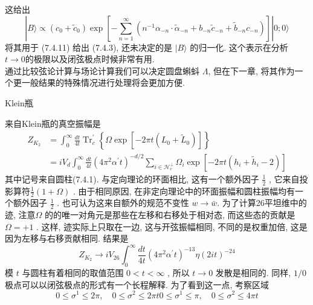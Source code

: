 这给出
\begin{equation}
	|B\rangle \propto\left(c_{0}+\tilde{c}_{0}\right) \exp \left[-\sum_{n=1}^{\infty}\left(n^{-1} \alpha_{-n} \cdot \tilde{\alpha}_{-n}+b_{-n} \tilde{c}_{-n}+\tilde{b}_{-n} c_{-n}\right)\right]|0 ; 0\rangle
\end{equation}
将其用于 (7.4.11) 给出 (7.4.3), 还未决定的是 $|B\rangle$ 的归一化. 这个表示在分析 $t \rightarrow 0$的极限以及闭弦极点时候非常有用.\\
通过比较弦论计算与场论计算我们可以决定圆盘蝌蚪 $\Lambda$, 但在下一章, 将其作为一个更一般结果的特殊情况进行处理将会更加方便.\\

\centerline{\Large Klein瓶}
来自Klein瓶的真空振幅是
\begin{equation}
	\begin{aligned}
		Z_{K_{2}} &=\int_{0}^{\infty} \frac{d t}{4 t} \operatorname{Tr}_{c}^{\prime}\left\{\Omega \exp \left[-2 \pi t\left(L_{0}+\tilde{L}_{0}\right)\right]\right\} \\
		&=i V_{d} \int_{0}^{\infty} \frac{d t}{4 t}\left(4 \pi^{2} \alpha^{\prime} t\right)^{-d / 2} \sum_{i \in \mathscr{H}_{c}^{\perp}} \Omega_{i} \exp \left[-2 \pi t\left(h_{i}+\tilde{h}_{i}-2\right)\right]
	\end{aligned}
\end{equation}
其中记号来自圆柱(7.4.1). 与定向理论的环面相比, 这有一个额外因子 $\frac{1}{2}$ , 它来自投影算符$\frac{1}{2}(1+\Omega) $ . 由于相同原因, 在非定向理论中的环面振幅和圆柱振幅均有一个额外因子 $\frac{1}{2}$ . 也可认为这来自额外的规范不变性 $w \rightarrow \bar{w}$. 为了计算26平坦维中的迹, 注意$\Omega$ 的的唯一对角元是那些在左移和右移处于相对态, 而这些态的贡献是 $\Omega=+1 $ . 这样, 迹实际上只取在一边, 这与开弦振幅相同, 不同的是权重加倍, 这是因为左移与右移贡献相同. 结果是
\begin{equation}
	Z_{K_{2}} \rightarrow i V_{26} \int_{0}^{\infty} \frac{d t}{4 t}\left(4 \pi^{2} \alpha^{\prime} t\right)^{-13} \eta(2 i t)^{-24}
\end{equation}
模 $t$ 与圆柱有着相同的取值范围 $0<t<\infty$ , 所以 $t \rightarrow 0$ 发散是相同的. 同样, $1 / 0$极点可以以闭弦极点的形式有一个长程解释. 为了看到这一点, 考察区域
\begin{subequations}
\begin{equation}
0 \leq \sigma^{1} \leq 2 \pi, \quad 0 \leq \sigma^{2} \leq 2 \pi t 
\end{equation}
\begin{equation}
0 \leq \sigma^{1} \leq \pi, \quad 0 \leq \sigma^{2} \leq 4 \pi t
\end{equation}		
\end{subequations}
